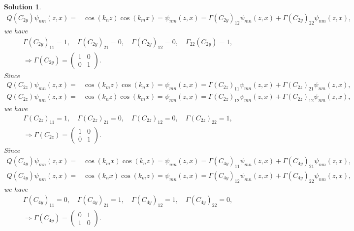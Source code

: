 \documentclass[UTF8,10pt,a4paper]{article}
\theoremstyle{Problem}
\theoremstyle{Solution}
\newtheorem*{sol}{Solution}
\begin{document}
\begin{sol}
\begin{align}
        Q(C_{2y})\psi_{nm}(z,x)=&\cos(k_nz)\cos(k_mx)=\psi_{nm}(z,x)=\Gamma(C_{2y})_{12}\psi_{mn}(z,x)+\Gamma(C_{2y})_{22}\psi_{nm}(z,x),
    \end{align}
    we have
    \begin{gather}
        \Gamma(C_{2y})_{11}=1,\quad\Gamma(C_{2y})_{21}=0,\quad\Gamma(C_{2y})_{12}=0,\quad\Gamma_{22}(C_{2y})=1,\\
        \Longrightarrow\Gamma(C_{2y})=\left(\begin{matrix}
            1&0\\
            0&1
        \end{matrix}\right).
    \end{gather}
    Since
    \begin{align}
        Q(C_{2z})\psi_{mn}(z,x)=&\cos(k_mz)\cos(k_nx)=\psi_{mn}(z,x)=\Gamma(C_{2z})_{11}\psi_{mn}(z,x)+\Gamma(C_{2z})_{21}\psi_{nm}(z,x),\\
        Q(C_{2z})\psi_{nm}(z,x)=&\cos(k_nz)\cos(k_mx)=\psi_{nm}(z,x)=\Gamma(C_{2z})_{12}\psi_{mn}(z,x)+\Gamma(C_{2z})_{12}\psi_{nm}(z,x),
    \end{align}
    we have
    \begin{gather}
        \Gamma(C_{2z})_{11}=1,\quad\Gamma(C_{2z})_{21}=0,\quad\Gamma(C_{2z})_{12}=0,\quad\Gamma(C_{2z})_{22}=1,\\
        \Longrightarrow\Gamma(C_{2z})=\left(\begin{matrix}
            1&0\\
            0&1
        \end{matrix}\right).
    \end{gather}
    Since
    \begin{align}
        Q(C_{4y})\psi_{mn}(z,x)=&\cos(k_mx)\cos(k_nz)=\psi_{nm}(z,x)=\Gamma(C_{4y})_{11}\psi_{mn}(z,x)+\Gamma(C_{4y})_{21}\psi_{nm}(z,x),\\
        Q(C_{4y})\psi_{nm}(z,x)=&\cos(k_nx)\cos(k_mz)=\psi_{mn}(z,x)=\Gamma(C_{4y})_{12}\psi_{mn}(z,x)+\Gamma(C_{4y})_{22}\psi_{nm}(z,x),
    \end{align}
    we have
    \begin{gather}
        \Gamma(C_{4y})_{11}=0,\quad\Gamma(C_{4y})_{21}=1,\quad\Gamma(C_{4y})_{12}=1,\quad\Gamma(C_{4y})_{22}=0,\\
        \Longrightarrow\Gamma(C_{4y})=\left(\begin{matrix}
            0&1\\
            1&0
        \end{matrix}\right).
    \end{gather}

\end{sol}
\end{document}
